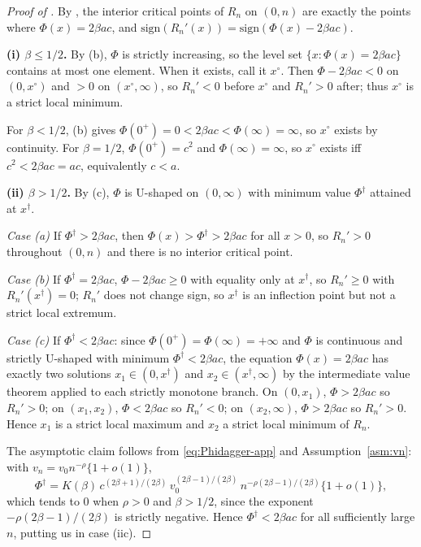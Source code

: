 \begin{proof}[Proof of ]
By , the interior critical points of $R_n$ on $(0,n)$ are exactly the points where $\Phi(x) = 2\beta a c$, and $\mathrm{sign}(R_n'(x)) = \mathrm{sign}(\Phi(x) - 2\beta a c)$.

\textbf{(i) $\beta \le 1/2$.} By (b), $\Phi$ is strictly increasing, so the level set $\{x : \Phi(x) = 2\beta a c\}$ contains at most one element. When it exists, call it $x^\circ$. Then $\Phi - 2\beta a c < 0$ on $(0, x^\circ)$ and $> 0$ on $(x^\circ, \infty)$, so $R_n' < 0$ before $x^\circ$ and $R_n' > 0$ after; thus $x^\circ$ is a strict local minimum.

For $\beta < 1/2$, (b) gives $\Phi(0^+) = 0 < 2\beta a c < \Phi(\infty) = \infty$, so $x^\circ$ exists by continuity. For $\beta = 1/2$, $\Phi(0^+) = c^2$ and $\Phi(\infty) = \infty$, so $x^\circ$ exists iff $c^2 < 2\beta a c = a c$, equivalently $c < a$.

\textbf{(ii) $\beta > 1/2$.} By (c), $\Phi$ is U-shaped on $(0,\infty)$ with minimum value $\Phi^\dagger$ attained at $x^\dagger$.

\emph{Case (a)} If $\Phi^\dagger > 2\beta a c$, then $\Phi(x) > \Phi^\dagger > 2\beta a c$ for all $x > 0$, so $R_n' > 0$ throughout $(0,n)$ and there is no interior critical point.

\emph{Case (b)} If $\Phi^\dagger = 2\beta a c$, $\Phi - 2\beta a c \ge 0$ with equality only at $x^\dagger$, so $R_n' \ge 0$ with $R_n'(x^\dagger) = 0$; $R_n'$ does not change sign, so $x^\dagger$ is an inflection point but not a strict local extremum.

\emph{Case (c)} If $\Phi^\dagger < 2\beta a c$: since $\Phi(0^+) = \Phi(\infty) = +\infty$ and $\Phi$ is continuous and strictly U-shaped with minimum $\Phi^\dagger < 2\beta a c$, the equation $\Phi(x) = 2\beta a c$ has exactly two solutions $x_1 \in (0, x^\dagger)$ and $x_2 \in (x^\dagger, \infty)$ by the intermediate value theorem applied to each strictly monotone branch. On $(0, x_1)$, $\Phi > 2\beta a c$ so $R_n' > 0$; on $(x_1, x_2)$, $\Phi < 2\beta a c$ so $R_n' < 0$; on $(x_2, \infty)$, $\Phi > 2\beta a c$ so $R_n' > 0$. Hence $x_1$ is a strict local maximum and $x_2$ a strict local minimum of $R_n$.

The asymptotic claim follows from \cref{eq:Phidagger-app} and Assumption~\ref{asm:vn}: with $v_n = v_0 n^{-\rho}\{1 + o(1)\}$,
\[
\Phi^\dagger = K(\beta)\, c^{(2\beta+1)/(2\beta)}\, v_0^{(2\beta-1)/(2\beta)}\,
n^{-\rho(2\beta-1)/(2\beta)}\{1 + o(1)\},
\]
which tends to $0$ when $\rho > 0$ and $\beta > 1/2$, since the exponent $-\rho(2\beta-1)/(2\beta)$ is strictly negative. Hence $\Phi^\dagger < 2\beta a c$ for all sufficiently large $n$, putting us in case (iic).
\end{proof}

